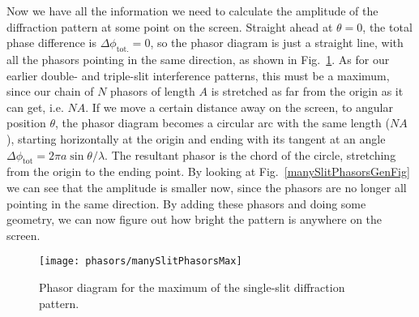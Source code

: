 Now we have all the information we need to calculate the amplitude of
the diffraction pattern at some point on the screen. Straight ahead at
$\theta=0$, the total phase difference is $\Delta\phi_\text{tot.}= 0$,
so the phasor diagram is just a straight line, with all the phasors
pointing in the same direction, as shown in 
Fig.~\ref{manySlitPhasorsMaxFig}.  As for our earlier double- and
triple-slit interference patterns, this must be a maximum, since our
chain of $N$ phasors of length $A$ is stretched as far from the origin
as it can get, i.e. $NA$.  If we move a certain distance away on the
screen, to angular position $\theta$, the phasor diagram becomes a
circular arc with the same length ($NA$), starting horizontally at the
origin and ending with its tangent at an angle $\Delta \phi_\text{tot}
= 2\pi a\sin\theta/\lambda$.  The resultant phasor is the chord of the
circle, stretching from the origin to the ending point. By looking
at Fig.~\ref{manySlitPhasorsGenFig} we can see that the
amplitude is smaller now, since the phasors are no longer all pointing in the
same direction.  By adding these phasors and doing some geometry, we can
now figure out how bright the pattern is anywhere on the screen.



\begin{figure}
\begin{center}
\texttt{[image: phasors/manySlitPhasorsMax]}
\end{center}
\caption{\label{manySlitPhasorsMaxFig}Phasor diagram for the maximum of the
single-slit diffraction pattern.}
\end{figure}




